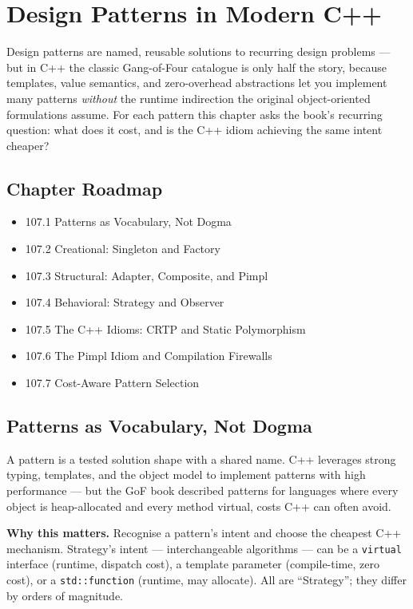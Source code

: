 \chapter{Design Patterns in Modern C++}

Design patterns are named, reusable solutions to recurring design problems --- but in C++ the classic Gang-of-Four catalogue is only half the story, because templates, value semantics, and zero-overhead abstractions let you implement many patterns \emph{without} the runtime indirection the original object-oriented formulations assume. For each pattern this chapter asks the book's recurring question: what does it cost, and is the C++ idiom achieving the same intent cheaper?

\section*{Chapter Roadmap}
\begin{itemize}
\item 107.1 Patterns as Vocabulary, Not Dogma
\item 107.2 Creational: Singleton and Factory
\item 107.3 Structural: Adapter, Composite, and Pimpl
\item 107.4 Behavioral: Strategy and Observer
\item 107.5 The C++ Idioms: CRTP and Static Polymorphism
\item 107.6 The Pimpl Idiom and Compilation Firewalls
\item 107.7 Cost-Aware Pattern Selection
\end{itemize}

\section{Patterns as Vocabulary, Not Dogma}
A pattern is a tested solution shape with a shared name. C++ leverages strong typing, templates, and the object model to implement patterns with high performance --- but the GoF book described patterns for languages where every object is heap-allocated and every method virtual, costs C++ can often avoid.

\textbf{Why this matters.} Recognise a pattern's intent and choose the cheapest C++ mechanism. Strategy's intent --- interchangeable algorithms --- can be a \texttt{virtual} interface (runtime, dispatch cost), a template parameter (compile-time, zero cost), or a \texttt{std::function} (runtime, may allocate). All are ``Strategy''; they differ by orders of magnitude.

